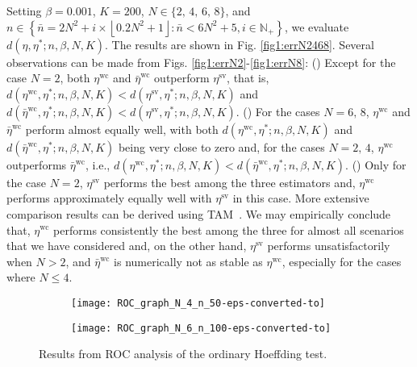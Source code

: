 \documentclass[10pt, twocolumn]{IEEEtran}
\begin{document}
{Setting $\beta = 0.001$, $K = 200$, $N \in \{2, \,4, \,6, \,8\}$,
  and $n \in \left\{ {\bar n = 2{N^2} + i \times \left\lfloor {0.2{N^2}
          + 1} \right\rfloor : \bar n < 6{N^2} + 5,i \in \mathbb{N_+}}
  \right\}$, we evaluate $d\left( {\hat \eta ,\eta^{*} ;n, \beta, N, K}
  \right)$. The results are shown in Fig. \ref{fig1:errN2468}. Several
  observations can be made from Figs. \ref{fig1:errN2}-\ref{fig1:errN8}:
  () Except for the case $N = 2$, both $\eta^{\text{wc}}$ and
  $\bar \eta^{\text{wc}}$ outperform $\eta^{\text{sv}}$, that is,
  $d\left( {\eta^{\text{wc}} ,\eta^{*} ;n, \beta, N, K} \right) <
  d\left( {\eta^{\text{sv}} ,\eta^{*} ;n, \beta, N, K} \right)$ and
  $d\left( {\bar \eta^{\text{wc}} ,\eta^{*} ;n, \beta, N, K} \right) <
  d\left( {\eta^{\text{sv}} ,\eta^{*} ;n, \beta, N, K}
  \right)$. () For the cases $N = 6, \,8$, $\eta^{\text{wc}}$
  and $\bar \eta^{\text{wc}}$ perform almost equally well, with both
  $d\left( {\eta^{\text{wc}} ,\eta^{*} ;n, \beta, N, K} \right)$ and
  $d\left( {\bar \eta^{\text{wc}} ,\eta^{*} ;n, \beta, N, K} \right)$
  being very close to zero and, for the cases $N = 2, \,4$,
  $\eta^{\text{wc}}$ outperforms $\bar \eta^{\text{wc}}$, i.e., 
  $d\left( { \eta^{\text{wc}} ,\eta^{*} ;n, \beta, N, K} \right) <
  d\left( {\bar \eta^{\text{wc}} ,\eta^{*} ;n, \beta, N, K}
  \right)$. () Only for the case $N = 2$, $\eta^{\text{sv}}$
  performs the best among the three estimators and, $\eta^{\text{wc}}$
  performs approximately equally well with $\eta^{\text{sv}}$ in this
  case. More extensive comparison results can be derived using
  TAM~\cite{TAHTMA}. We 
  may empirically conclude that, $\eta^{\text{wc}}$ performs
  consistently the best among the three for almost all scenarios that we
  have considered and, on the other hand, $\eta^{\text{sv}}$ performs
  unsatisfactorily when $N > 2$, and $\bar \eta^{\text{wc}}$ is
  numerically not as stable as $\eta^{\text{wc}}$, especially for the
  cases where $N \le
  4$.} 

\begin{figure*}[ht]  
	\centering
	\begin{subfigure}[b]{0.495\textwidth}
		\texttt{[image: ROC\_graph\_N\_4\_n\_50-eps-converted-to]}
		\caption{}
		\label{ROC-gr4}
	\end{subfigure}  
	\begin{subfigure}[b]{0.495\textwidth}
		\texttt{[image: ROC\_graph\_N\_6\_n\_100-eps-converted-to]}
		\caption{}
		\label{ROC-gr6}
	\end{subfigure} 
	\caption{Results from ROC analysis of the ordinary Hoeffding test.}
	\label{fig:ROCana}
\end{figure*}
\end{document}
